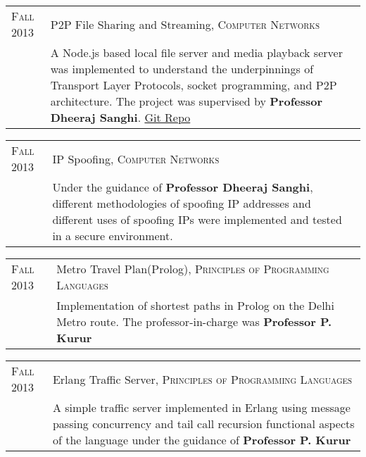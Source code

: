 \documentclass[a4paper,10pt]{article} %
\begin{document}
\begin{tabular}{p{2.2cm}|p{11cm}}
    \textsc{Fall 2013} & P2P File Sharing and Streaming, \textsc{Computer Networks} \\
                       & \footnotesize{A Node.js based local file server and media playback server was implemented
                          to understand the underpinnings of Transport Layer Protocols, socket programming,
                          and P2P architecture.  The project was supervised by \textbf{Professor Dheeraj Sanghi}.
                          \href{https://github.com/srijanshetty/nodesock} {Git Repo}}\\
\end{tabular}

\begin{tabular}{p{2.2cm}|p{11cm}}
    \textsc{Fall 2013} & IP Spoofing, \textsc{Computer Networks} \\
                       & \footnotesize{Under the guidance of \textbf{Professor Dheeraj Sanghi}, different methodologies
                          of spoofing IP addresses and different uses of spoofing IPs were implemented and tested
                          in a secure environment.}\\
\end{tabular}

\begin{tabular}{p{2.2cm}|p{11cm}}
    \textsc{Fall 2013} & Metro Travel Plan(Prolog), \textsc{Principles of Programming Languages} \\
                       & \footnotesize{Implementation of shortest paths in Prolog on the Delhi Metro route.
                          The professor-in-charge was \textbf{Professor P. Kurur}}\\
\end{tabular}

\begin{tabular}{p{2.2cm}|p{11cm}}
    \textsc{Fall 2013} & Erlang Traffic Server, \textsc{Principles of Programming Languages} \\
                       & \footnotesize{A simple traffic server implemented in Erlang using message passing
                          concurrency and tail call recursion functional aspects of the language under the
                          guidance of \textbf{Professor P. Kurur}}\\
\end{tabular}
\end{document}
